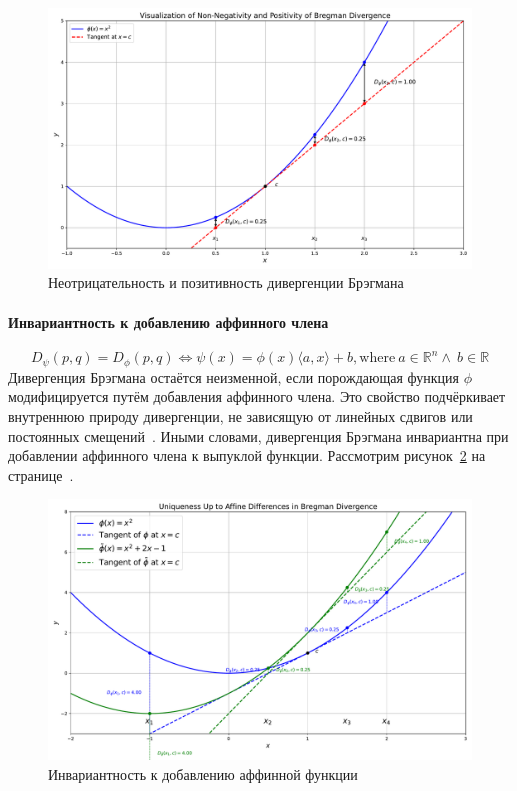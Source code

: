 \documentclass[12pt]{scrartcl}
\begin{document}
\begin{figure}[h]
    \centering
    \includegraphics[width=\textwidth]{non-neg.pdf} %
    \caption{Неотрицательность и позитивность дивергенции Брэгмана}
    \label{fig:non-neg}
\end{figure}

\paragraph{Инвариантность к добавлению аффинного члена}\label{par:affine_difference}
\begin{equation}
    D_\psi (p,q) = D_\phi(p,q) \Longleftrightarrow \psi(x) = \phi (x) \langle a, x \rangle + b, \text{where}\ a \in \mathbb{R}^n \wedge \ b \in \mathbb{R}
\end{equation}
Дивергенция Брэгмана остаётся неизменной, если порождающая функция $\phi$ модифицируется путём добавления аффинного члена. Это свойство подчёркивает внутреннюю природу дивергенции, не зависящую от линейных сдвигов или постоянных смещений~\cite{Harremoes2017}. Иными словами, дивергенция Брэгмана инвариантна при добавлении аффинного  члена к выпуклой функции. Рассмотрим рисунок~\ref{fig:affinity} на странице~\pageref{fig:affinity}.

\begin{figure}[h]
    \centering
    \includegraphics[width=\textwidth]{affinnity.pdf} %
    \caption{Инвариантность к добавлению аффинной функции}
    \label{fig:affinity}
\end{figure}
\end{document}
